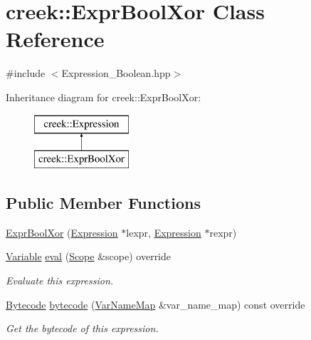 \hypertarget{classcreek_1_1_expr_bool_xor}{}\section{creek\+:\+:Expr\+Bool\+Xor Class Reference}
\label{classcreek_1_1_expr_bool_xor}


{\ttfamily \#include $<$Expression\+\_\+\+Boolean.\+hpp$>$}

Inheritance diagram for creek\+:\+:Expr\+Bool\+Xor\+:\begin{figure}[H]
\begin{center}
\leavevmode
\includegraphics[height=2.000000cm]{classcreek_1_1_expr_bool_xor}
\end{center}
\end{figure}
\subsection*{Public Member Functions}
\begin{DoxyCompactItemize}
\item 
\hyperlink{classcreek_1_1_expr_bool_xor_a57041816285855aed8a5e081c8d81f83}{Expr\+Bool\+Xor} (\hyperlink{classcreek_1_1_expression}{Expression} $\ast$lexpr, \hyperlink{classcreek_1_1_expression}{Expression} $\ast$rexpr)
\item 
\hyperlink{classcreek_1_1_variable}{Variable} \hyperlink{classcreek_1_1_expr_bool_xor_a16d8f13d6c8393ef58bf30b0bd9c53ae}{eval} (\hyperlink{classcreek_1_1_scope}{Scope} \&scope) override
\begin{DoxyCompactList}\small\item\em Evaluate this expression. \end{DoxyCompactList}\item 
\hyperlink{classcreek_1_1_bytecode}{Bytecode} \hyperlink{classcreek_1_1_expr_bool_xor_a424a17a2d1d8a1a5f07e812bbceb383f}{bytecode} (\hyperlink{classcreek_1_1_var_name_map}{Var\+Name\+Map} \&var\+\_\+name\+\_\+map) const  override\hypertarget{classcreek_1_1_expr_bool_xor_a424a17a2d1d8a1a5f07e812bbceb383f}{}\label{classcreek_1_1_expr_bool_xor_a424a17a2d1d8a1a5f07e812bbceb383f}

\begin{DoxyCompactList}\small\item\em Get the bytecode of this expression. \end{DoxyCompactList}\end{DoxyCompactItemize}



